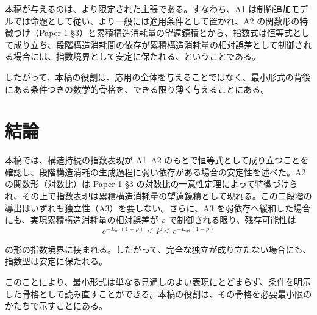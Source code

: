 \documentclass[12pt,a4paper]{article}
\begin{document}
本稿が与えるのは、より限定された主張である。すなわち、A1 は制約追加モデルでは命題として従い、より一般には適用条件として置かれ、A2 の関数形の特徴づけ（Paper 1 §3）と累積構造消耗量の望遠鏡積とから、指数式は恒等式として成り立ち、段階構造消耗間の依存が累積構造消耗量の相対誤差として制御される場合には、指数境界として安定に保たれる、ということである。

したがって、本稿の役割は、応用の全体を与えることではなく、最小形式の背後にある条件つきの数学的骨格を、できる限り薄く与えることにある。

\section{結論}\label{ux7d50ux8ad6}

本稿では、構造持続の指数表現が A1--A2 のもとで恒等式として成り立つことを確認し、段階構造消耗の生成過程に弱い依存がある場合の安定性を述べた。A2 の関数形（対数比）は Paper 1 §3 の対数比の一意性定理によって特徴づけられ、その上で指数表現は累積構造消耗量の望遠鏡積として現れる。この二段階の導出はいずれも独立性（A3）を要しない。さらに、A3 を弱依存へ緩和した場合にも、実現累積構造消耗量の相対誤差が \(\rho\) で制御される限り、残存可能性は \[
e^{-L_{\text{ref}}(1+\rho)} \le P \le e^{-L_{\text{ref}}(1-\rho)}
\]

の形の指数境界に挟まれる。したがって、完全な独立が成り立たない場合にも、指数型は安定に保たれる。

このことにより、最小形式は単なる見通しのよい表現にとどまらず、条件を明示した骨格として読み直すことができる。本稿の役割は、その骨格を必要最小限のかたちで示すことにある。
\end{document}
